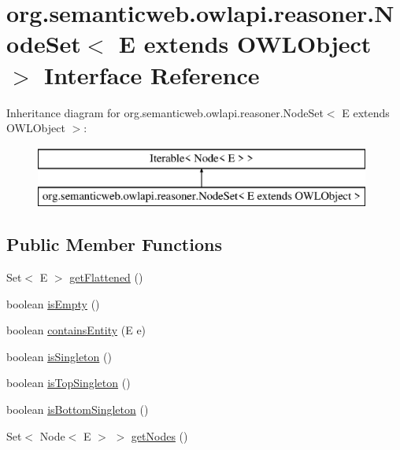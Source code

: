 \hypertarget{interfaceorg_1_1semanticweb_1_1owlapi_1_1reasoner_1_1_node_set_3_01_e_01extends_01_o_w_l_object_01_4}{\section{org.\-semanticweb.\-owlapi.\-reasoner.\-Node\-Set$<$ E extends O\-W\-L\-Object $>$ Interface Reference}
\label{interfaceorg_1_1semanticweb_1_1owlapi_1_1reasoner_1_1_node_set_3_01_e_01extends_01_o_w_l_object_01_4}
}
Inheritance diagram for org.\-semanticweb.\-owlapi.\-reasoner.\-Node\-Set$<$ E extends O\-W\-L\-Object $>$\-:\begin{figure}[H]
\begin{center}
\leavevmode
\includegraphics[height=2.000000cm]{interfaceorg_1_1semanticweb_1_1owlapi_1_1reasoner_1_1_node_set_3_01_e_01extends_01_o_w_l_object_01_4}
\end{center}
\end{figure}
\subsection*{Public Member Functions}
\begin{DoxyCompactItemize}
\item 
Set$<$ E $>$ \hyperlink{interfaceorg_1_1semanticweb_1_1owlapi_1_1reasoner_1_1_node_set_3_01_e_01extends_01_o_w_l_object_01_4_a76bf86b11ad434575b56006d1f9d21e4}{get\-Flattened} ()
\item 
boolean \hyperlink{interfaceorg_1_1semanticweb_1_1owlapi_1_1reasoner_1_1_node_set_3_01_e_01extends_01_o_w_l_object_01_4_ae3dec2b65ba891d8ef28b2ce89dcbb7b}{is\-Empty} ()
\item 
boolean \hyperlink{interfaceorg_1_1semanticweb_1_1owlapi_1_1reasoner_1_1_node_set_3_01_e_01extends_01_o_w_l_object_01_4_afb560e0ef39bef6d9b4b06a27e6431d5}{contains\-Entity} (E e)
\item 
boolean \hyperlink{interfaceorg_1_1semanticweb_1_1owlapi_1_1reasoner_1_1_node_set_3_01_e_01extends_01_o_w_l_object_01_4_a38908a7b0af012bc856f9bb87d57c9d2}{is\-Singleton} ()
\item 
boolean \hyperlink{interfaceorg_1_1semanticweb_1_1owlapi_1_1reasoner_1_1_node_set_3_01_e_01extends_01_o_w_l_object_01_4_af597603c9e4b54a7a6d610f76eb324c6}{is\-Top\-Singleton} ()
\item 
boolean \hyperlink{interfaceorg_1_1semanticweb_1_1owlapi_1_1reasoner_1_1_node_set_3_01_e_01extends_01_o_w_l_object_01_4_a4b12d885eb4b970a12e40c7b9c13e172}{is\-Bottom\-Singleton} ()
\item 
Set$<$ Node$<$ E $>$ $>$ \hyperlink{interfaceorg_1_1semanticweb_1_1owlapi_1_1reasoner_1_1_node_set_3_01_e_01extends_01_o_w_l_object_01_4_a03efc0f91365c46a582744a9907feb83}{get\-Nodes} ()
\end{DoxyCompactItemize}


